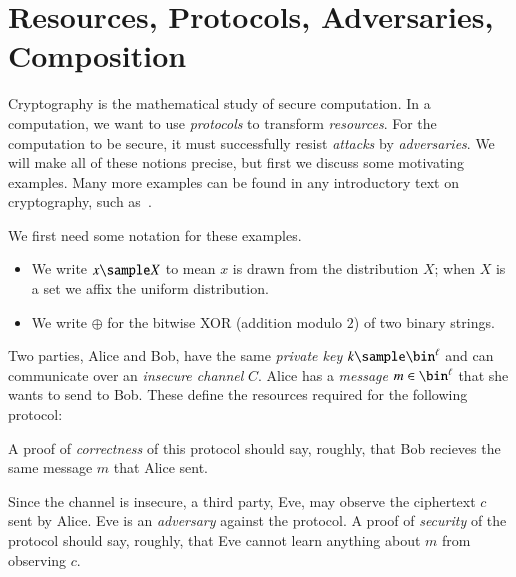 
\section{Resources, Protocols, Adversaries, Composition}

Cryptography is the mathematical study of secure computation. In a computation,
we want to use \emph{protocols} to transform \emph{resources}. For the
computation to be secure, it must successfully resist \emph{attacks} by
\emph{adversaries}. We will make all of these notions precise, but first we
discuss some motivating examples. Many more examples can be found in any
introductory text on cryptography, such as~\cite{katz-lindell-2014, rosulek-2021,
pass-shelat-2020}.

\begin{ntn}
  We first need some notation for these examples.
  \begin{itemize}
    \item We write $x\sample X$ to mean $x$ is drawn from the distribution
      $X$; when $X$ is a set we affix the uniform distribution.
    \item We write $\oplus$ for the bitwise XOR (addition modulo $2$) of two
      binary strings.
  \end{itemize}
\end{ntn}

\begin{ex}\label{ex:one-time pad}
  Two parties, Alice and Bob, have the same \emph{private key}
  $k\sample\bin^\ell$ and can communicate over an \emph{insecure channel} $C$.
  Alice has a \emph{message} $m\in\bin^\ell$ that she wants to send to Bob.
  These define the resources required for the following protocol:


  \noindent
  A proof of \emph{correctness} of this protocol should say, roughly, that Bob
  recieves the same message $m$ that Alice sent.

  Since the channel is insecure, a third party, Eve, may observe the ciphertext
  $c$ sent by Alice. Eve is an \emph{adversary} against the protocol. A proof of
  \emph{security} of the protocol should say, roughly, that Eve cannot learn
  anything about $m$ from observing $c$.
\end{ex}

